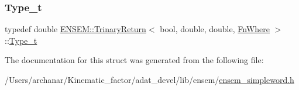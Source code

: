 \mbox{\label{structENSEM_1_1TrinaryReturn_3_01bool_00_01double_00_01double_00_01FnWhere_01_4_a9a6eb2e23b53eb2cd6021511101cd3a1}} 
\subsubsection{\texorpdfstring{Type\_t}{Type\_t}\hspace{0.1cm}{\footnotesize\ttfamily [2/2]}}
{\footnotesize\ttfamily typedef double \mbox{\hyperlink{structENSEM_1_1TrinaryReturn}{E\+N\+S\+E\+M\+::\+Trinary\+Return}}$<$ bool, double, double, \mbox{\hyperlink{structENSEM_1_1FnWhere}{Fn\+Where}} $>$\+::\mbox{\hyperlink{structENSEM_1_1TrinaryReturn_3_01bool_00_01double_00_01double_00_01FnWhere_01_4_a9a6eb2e23b53eb2cd6021511101cd3a1}{Type\+\_\+t}}}



The documentation for this struct was generated from the following file\+:\begin{DoxyCompactItemize}
\item 
/\+Users/archanar/\+Kinematic\+\_\+factor/adat\+\_\+devel/lib/ensem/\mbox{\hyperlink{lib_2ensem_2ensem__simpleword_8h}{ensem\+\_\+simpleword.\+h}}\end{DoxyCompactItemize}
